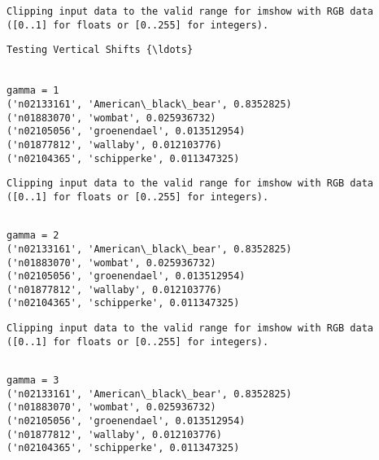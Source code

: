 \documentclass[11pt]{article}
\begin{document}
    \begin{Verbatim}[commandchars=\\\{\}]
Clipping input data to the valid range for imshow with RGB data ([0..1] for floats or [0..255] for integers).

    \end{Verbatim}

    \begin{Verbatim}[commandchars=\\\{\}]
Testing Vertical Shifts {\ldots}


gamma = 1
('n02133161', 'American\_black\_bear', 0.8352825)
('n01883070', 'wombat', 0.025936732)
('n02105056', 'groenendael', 0.013512954)
('n01877812', 'wallaby', 0.012103776)
('n02104365', 'schipperke', 0.011347325)

    \end{Verbatim}

    \begin{Verbatim}[commandchars=\\\{\}]
Clipping input data to the valid range for imshow with RGB data ([0..1] for floats or [0..255] for integers).

    \end{Verbatim}

    \begin{Verbatim}[commandchars=\\\{\}]

gamma = 2
('n02133161', 'American\_black\_bear', 0.8352825)
('n01883070', 'wombat', 0.025936732)
('n02105056', 'groenendael', 0.013512954)
('n01877812', 'wallaby', 0.012103776)
('n02104365', 'schipperke', 0.011347325)

    \end{Verbatim}

    \begin{Verbatim}[commandchars=\\\{\}]
Clipping input data to the valid range for imshow with RGB data ([0..1] for floats or [0..255] for integers).

    \end{Verbatim}

    \begin{Verbatim}[commandchars=\\\{\}]

gamma = 3
('n02133161', 'American\_black\_bear', 0.8352825)
('n01883070', 'wombat', 0.025936732)
('n02105056', 'groenendael', 0.013512954)
('n01877812', 'wallaby', 0.012103776)
('n02104365', 'schipperke', 0.011347325)

    \end{Verbatim}
\end{document}

